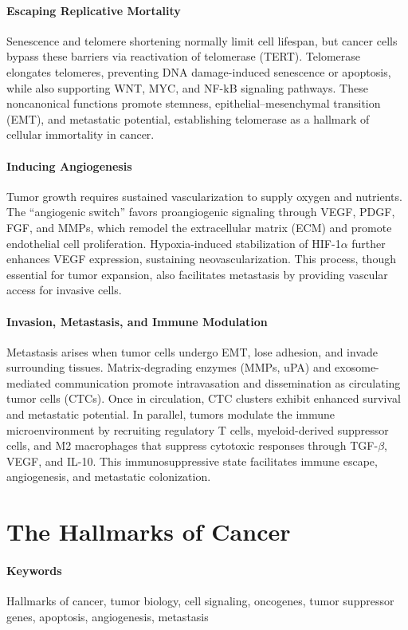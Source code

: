 \documentclass[10pt]{extarticle}
\begin{document}
\paragraph{Escaping Replicative Mortality}
Senescence and telomere shortening normally limit cell lifespan, but cancer cells bypass these barriers via reactivation of telomerase (TERT). Telomerase elongates telomeres, preventing DNA damage-induced senescence or apoptosis, while also supporting WNT, MYC, and NF-kB signaling pathways. These noncanonical functions promote stemness, epithelial–mesenchymal transition (EMT), and metastatic potential, establishing telomerase as a hallmark of cellular immortality in cancer.

\paragraph{Inducing Angiogenesis}
Tumor growth requires sustained vascularization to supply oxygen and nutrients. The “angiogenic switch” favors proangiogenic signaling through VEGF, PDGF, FGF, and MMPs, which remodel the extracellular matrix (ECM) and promote endothelial cell proliferation. Hypoxia-induced stabilization of HIF-1$\alpha$ further enhances VEGF expression, sustaining neovascularization. This process, though essential for tumor expansion, also facilitates metastasis by providing vascular access for invasive cells.

\paragraph{Invasion, Metastasis, and Immune Modulation}
Metastasis arises when tumor cells undergo EMT, lose adhesion, and invade surrounding tissues. Matrix-degrading enzymes (MMPs, uPA) and exosome-mediated communication promote intravasation and dissemination as circulating tumor cells (CTCs). Once in circulation, CTC clusters exhibit enhanced survival and metastatic potential. In parallel, tumors modulate the immune microenvironment by recruiting regulatory T cells, myeloid-derived suppressor cells, and M2 macrophages that suppress cytotoxic responses through TGF-$\beta$, VEGF, and IL-10. This immunosuppressive state facilitates immune escape, angiogenesis, and metastatic colonization.

\section{The Hallmarks of Cancer}

\paragraph{Keywords} Hallmarks of cancer, tumor biology, cell signaling, oncogenes, tumor suppressor genes, apoptosis, angiogenesis, metastasis  \cite{hanahan2000hallmarks}
\end{document}
